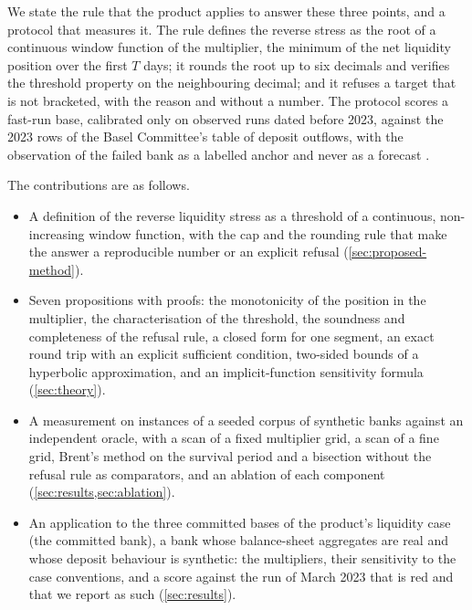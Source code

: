 We state the rule that the product applies to answer these three points, and a protocol that measures it. The rule defines the reverse stress as the root of a continuous window function of the multiplier, the minimum of the net liquidity position over the first $T$ days; it rounds the root up to six decimals and verifies the threshold property on the neighbouring decimal; and it refuses a target that is not bracketed, with the reason and without a number. The protocol scores a fast-run base, calibrated only on observed runs dated before 2023, against the 2023 rows of the Basel Committee's table of deposit outflows, with the observation of the failed bank as a labelled anchor and never as a forecast \citep{bcbs555}.

The contributions are as follows.
\begin{itemize}
\item A definition of the reverse liquidity stress as a threshold of a continuous, non-increasing window function, with the cap and the rounding rule that make the answer a reproducible number or an explicit refusal (\cref{sec:proposed-method}).
\item Seven propositions with proofs: the monotonicity of the position in the multiplier, the characterisation of the threshold, the soundness and completeness of the refusal rule, a closed form for one segment, an exact round trip with an explicit sufficient condition, two-sided bounds of a hyperbolic approximation, and an implicit-function sensitivity formula (\cref{sec:theory}).
\item A measurement on \kInst{} instances of a seeded corpus of synthetic banks against an independent oracle, with a scan of a fixed multiplier grid, a scan of a fine grid, Brent's method on the survival period and a bisection without the refusal rule as comparators, and an ablation of each component (\cref{sec:results,sec:ablation}).
\item An application to the three committed bases of the product's liquidity case (the committed bank), a bank whose balance-sheet aggregates are real and whose deposit behaviour is synthetic: the multipliers, their sensitivity to the case conventions, and a score against the run of March 2023 that is red and that we report as such (\cref{sec:results}).
\end{itemize}

